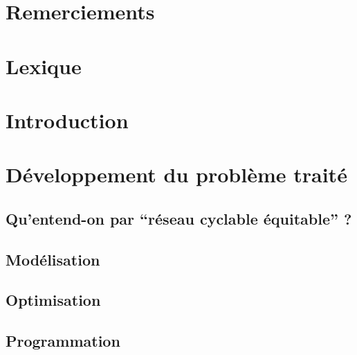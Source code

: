 \documentclass[a4paper,12pt,french]{article}
\begin{document}
\renewcommand{\labelitemi}{\textbullet}
\allowdisplaybreaks


\clearpage
\hfill
\clearpage
\renewcommand{\headrule}{
    \vspace{-8pt}
    \hrulefill\
}

\section*{Remerciements}


\newpage
\tableofcontents
\newpage

\setlength{\parskip}{1em} %

\section{Lexique}


\section{Introduction}


\section{Développement du problème traité}
\subsection{Qu'entend-on par ``réseau cyclable équitable'' ?} \label{sect:equite}


\subsection{Modélisation} \label{sect:modelisation}


\subsection{Optimisation}


\subsection{Programmation}

\end{document}

